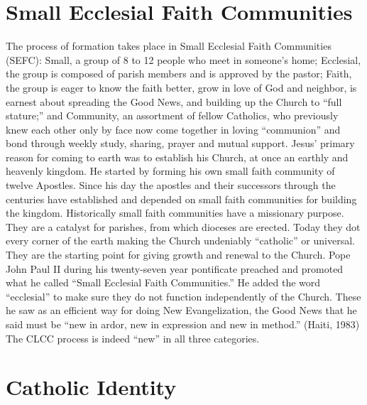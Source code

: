 \documentclass{article}        %
\begin{document}
\section{Small Ecclesial Faith Communities}

The process of formation takes place in Small Ecclesial Faith Communities
(SEFC): Small, a group of 8 to 12 people who meet in someone's home; Ecclesial,
the group is composed of parish members and is approved by the pastor; Faith,
the group is eager to know the faith better, grow in love of God and neighbor,
is earnest about spreading the Good News, and building up the Church to ``full
stature;'' and Community, an assortment of fellow Catholics, who previously knew
each other only by face now come together in loving ``communion'' and bond
through weekly study, sharing, prayer and mutual support.
Jesus' primary reason for coming to earth was to establish his Church, at once
an earthly and heavenly kingdom. He started by forming his own small faith
community of twelve Apostles. Since his day the apostles and their successors
through the centuries have established and depended on small faith communities
for building the kingdom. Historically small faith communities have a missionary
purpose. They are a catalyst for parishes, from which dioceses are
erected. Today they dot every corner of the earth making the Church undeniably
``catholic'' or universal. They are the starting point for giving growth and
renewal to the Church.
Pope John Paul II during his twenty-seven year pontificate preached and promoted
what he called ``Small Ecclesial Faith Communities.'' He added the word
``ecclesial'' to make sure they do not function independently of the
Church. These he saw as an efficient way for doing New Evangelization, the Good
News that he said must be ``new in ardor, new in expression and new in method.''
(Haiti, 1983) The CLCC process is indeed ``new'' in all three categories.

\section{Catholic Identity}
\end{document}
